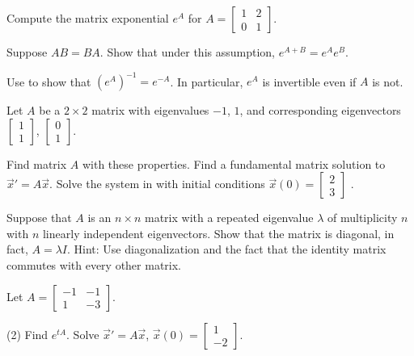 \begin{exercise}
Compute the matrix exponential $e^A$ for
$A = \left[ \begin{smallmatrix} 1 & 2 \\ 0 & 1 \end{smallmatrix} \right]$.
\end{exercise}

\begin{exercise}[challenging] \label{matexp:explawex}
Suppose $AB = BA$.  Show that under this assumption, $e^{A+B} = e^A e^B$.
\end{exercise}

\begin{exercise} \label{matexp:expinvex}
Use 
to show that ${(e^{A})}^{-1} = e^{-A}$.  In particular,
$e^A$ is invertible even if $A$ is not.
\end{exercise}

\begin{exercise}
Let $A$ be a $2 \times 2$ matrix with eigenvalues $-1$, $1$, and
corresponding eigenvectors
$\left[ \begin{smallmatrix}
1 \\
1
\end{smallmatrix} \right]$,
$\left[ \begin{smallmatrix}
0 \\
1
\end{smallmatrix} \right]$.
\begin{tasks}
\task Find matrix $A$ with these properties.
\task Find a fundamental matrix solution to ${\vec{x}}' = A \vec{x}$.
\task Solve the system in with initial conditions $\vec{x}(0) =
\left[ \begin{smallmatrix}
2 \\
3
\end{smallmatrix} \right]$ .
\end{tasks}
\end{exercise}

\begin{exercise}
Suppose that $A$ is an $n \times n$ matrix with a repeated eigenvalue
$\lambda$ of multiplicity $n$ with
$n$ linearly independent eigenvectors.  Show that
the matrix is diagonal, in fact, $A = \lambda I$.  Hint: Use
diagonalization and the fact that the identity matrix commutes with every
other matrix.
\end{exercise}

\begin{exercise}
Let $A = \left[ \begin{smallmatrix}
-1 & -1 \\
1 & -3
\end{smallmatrix} \right]$.
\begin{tasks}(2)
\task Find $e^{tA}$.
\task Solve
${\vec{x}}' = A \vec{x}$, $\vec{x}(0) =
\left[ \begin{smallmatrix}
1 \\
-2
\end{smallmatrix} \right]$.
\end{tasks}
\end{exercise}

